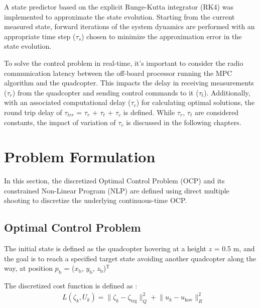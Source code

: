 \documentclass[conference]{IEEEtran}
\begin{document}
A state predictor based on the explicit Runge-Kutta integrator (RK4) was implemented to approximate the state evolution. Starting from the current measured state, forward iterations of the system dynamics are performed with an appropriate time step ($\tau_{s}$) chosen to minimize the approximation error in the state evolution.

To solve the control problem in real-time, it's important to consider the radio communication latency between the off-board processor running the MPC algorithm and the quadcopter. This impacts the delay in receiving measurements ($\tau_{r}$) from the quadcopter and sending control commands to it ($\tau_{t}$). Additionally, with an associated computational delay ($\tau_{c}$) for calculating optimal solutions, the round trip delay of $\tau_{trr}$ = $\tau_r$ + $\tau_t$ + $\tau_c$ is defined. While $\tau_{r}$, $\tau_{t}$ are considered constants, the impact of variation of $\tau_{c}$ is discussed in the following chapters.

\section{Problem Formulation}\label{Section3}

In this section, the discretized Optimal Control Problem (OCP) and its constrained Non-Linear Program (NLP) are defined using direct multiple shooting \cite{bock_multiple_1984} to discretize the underlying continuous-time OCP.

\subsection{Optimal Control Problem}

The initial state is defined as the quadcopter hovering at a height $z$ = 0.5 m, and the goal is to reach a specified target state avoiding another quadcopter along the way, at position  $p_\mathrm{b}$ = ($x_\mathrm{b}$, $y_\mathrm{b}$, $z_\mathrm{b}$)$\mathrm{^{T}}$

The discretized cost function is defined as :
\begin{align}
	& L\left(\zeta_k, U_k\right) = \lVert \zeta_k - \zeta_{\mathrm{trg}} \rVert^2_Q + \lVert u_k - u_{\mathrm{hov}} \rVert^2_R
\end{align}
\end{document}
